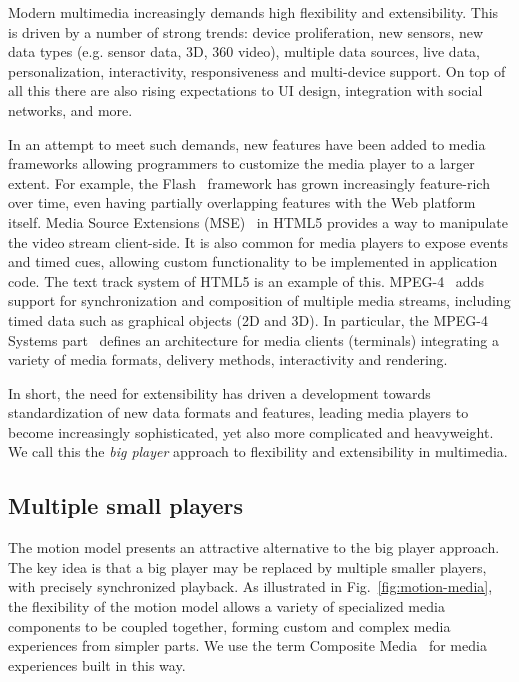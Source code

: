 Modern multimedia increasingly demands high flexibility and extensibility.
This is driven by a number of strong trends: device proliferation, new
sensors, new data types (e.g. sensor data, 3D, 360 video), multiple data
sources, live data, personalization, interactivity, responsiveness and multi-device 
support. On top of all this there are also rising expectations to UI
design, integration with social networks, and more.

In an attempt to meet such demands, new features have been added to media
frameworks allowing programmers to customize the media player to a larger
extent. For example, the Flash~\cite{flash} framework has grown increasingly
feature-rich over time, even having partially overlapping features with the
Web platform itself. Media Source Extensions (MSE)~\cite{mse} in HTML5
provides a way to manipulate the video stream client-side. It is also common
for media players to expose events and timed cues, allowing custom
functionality to be implemented in application code. The text track system of
HTML5 is an example of this. MPEG-4~\cite{mpeg4} adds support for
synchronization and composition of multiple media streams, including timed data
such as graphical objects (2D and 3D). In particular, the MPEG-4 Systems
part~\cite{mpeg4sys} defines an architecture for media clients (terminals)
integrating a variety of media formats, delivery methods, interactivity and
rendering.

In short, the need for extensibility has driven a development towards
standardization of new data formats and features, leading media players to
become increasingly sophisticated, yet also more complicated and heavyweight.
We call this the \emph{big player} approach to flexibility and extensibility in
multimedia.


\subsection{Multiple small players}

The motion model presents an attractive alternative to the big player
approach. The key idea is that a big player may be replaced by multiple
smaller players, with precisely synchronized playback. As illustrated in
Fig.~\ref{fig:motion-media}, the flexibility of the motion model allows a
variety of specialized media components to be coupled together, forming custom
and complex media experiences from simpler parts. We use the term Composite
Media~\cite{compositemedia} for media experiences built in this way.



